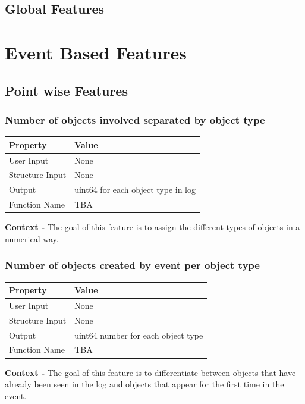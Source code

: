 \documentclass{article}
\begin{document}
\subsection{Global Features}
\section{Event Based Features}
\subsection{Point wise Features}

\subsubsection{Number of objects involved separated by object type}
\begin{center}
	\begin{tabular}{| p{3cm} p{7cm} |}
		\hline
		\textbf{Property} & \textbf{Value}\\
		\hline
		User Input & None\\
		Structure Input & None\\
		Output & uint64 for each object type in log\\
		Function Name & TBA\\
		\hline
	\end{tabular}
\end{center}

\textbf{Context -} The goal of this feature is to assign the different types of objects in a numerical way.
\\

\subsubsection{Number of objects created by event per object type}
\begin{center}
	\begin{tabular}{| p{3cm} p{7cm} |}
		\hline
		\textbf{Property} & \textbf{Value}\\
		\hline
		User Input & None\\
		Structure Input & None\\
		Output & uint64 number for each object type\\
		Function Name & TBA\\
		\hline
	\end{tabular}
\end{center}

\textbf{Context -} The goal of this feature is to differentiate between objects that have already been seen in the log and objects that appear for the first time in the event.
\\
\end{document}
